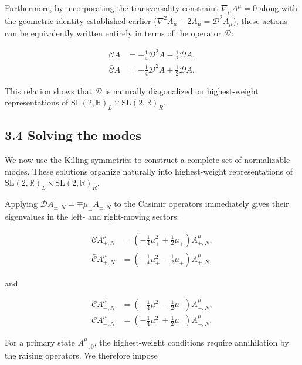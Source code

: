 Furthermore, by incorporating the transversality constraint $\nabla _{\mu}A^{\mu}=0$ along with the geometric identity established earlier ($\nabla^2 A_\mu + 2A_\mu = \mathcal{D}^2 A_\mu$), these actions can be equivalently written entirely in terms of the operator $\mathcal{D}$:

 \begin{align}
\mathcal{C}A & =-\frac{1}{4}\mathcal{D}^{2}A-\frac{1}{2}\mathcal{D}A, \\
\mathcal{\bar{C}}A & =-\frac{1}{4}\mathcal{D}^{2}A+\frac{1}{2}\mathcal{D}A.
\end{align}

This relation shows that $\mathcal{D}$ is naturally diagonalized on highest-weight representations of $\mathrm{SL}(2, \mathbb{R})_L \times \mathrm{SL}(2, \mathbb{R})_R$.

\subsection{3.4 Solving the modes}\label{subsec:solving-modes}

We now use the Killing symmetries to construct a complete set of normalizable modes. These solutions organize naturally into highest-weight representations of $\mathrm{SL}(2, \mathbb{R})_L \times \mathrm{SL}(2, \mathbb{R})_R$.

Applying $\mathcal{D} A_{\pm,N} = \mp \mu_\pm A_{\pm,N}$ to the Casimir operators immediately gives their eigenvalues in the left- and right-moving sectors:

 \begin{align}
\mathcal{C}A_{+,N}^{\mu} & =\left(-\frac{1}{4}\mu _{+}^{2}+\frac{1}{2}\mu _{+}\right)A_{+,N}^{\mu}, \\
\mathcal{\bar{C}}A_{+,N}^{\mu} & =\left(-\frac{1}{4}\mu _{+}^{2}-\frac{1}{2}\mu _{+}\right)A_{+,N}^{\mu}
\end{align}

and

 \begin{align}
\mathcal{C}A_{-,N}^{\mu} & =\left(-\frac{1}{4}\mu _{-}^{2}-\frac{1}{2}\mu _{-}\right)A_{-,N}^{\mu}, \\
\mathcal{\bar{C}}A_{-,N}^{\mu} & =\left(-\frac{1}{4}\mu _{-}^{2}+\frac{1}{2}\mu _{-}\right)A_{-,N}^{\mu}.
\end{align}

For a primary state $A_{\pm,0}^\mu$, the highest-weight conditions require annihilation by the raising operators. We therefore impose

